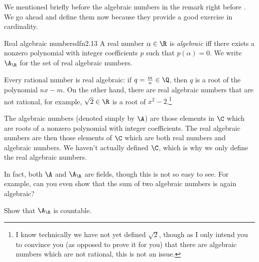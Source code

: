 We mentioned briefly before the algebraic numbers in the remark right before .  We go ahead and define them now because they provide a good exercise in cardinality.
\begin{dfn}{Real algebraic numbers}{dfn2.13}
A real number $\alpha \in \R$ is \emph{algebraic} iff there exists a nonzero polynomial with integer coefficients $p$ such that $p(\alpha )=0$.  We write $\A _{\R}$\index[notation]{$\A _{\R}$} for the set of real algebraic numbers.
\begin{rmk}
Every rational number is real algebraic:  if $q=\frac{m}{n}\in \Q$, then $q$ is a root of the polynomial $nx-m$.  On the other hand, there are real algebraic numbers that are not rational, for example, $\sqrt{2}\in \R$ is a root of $x^2-2$.\footnote{I know technically we have not yet defined $\sqrt{2}$, though as I only intend you to convince you (as opposed to prove it for you) that there are algebraic numbers which are not rational, this is not an issue.}
\end{rmk}
\begin{rmk}
The algebraic numbers (denoted simply by $\A$\index[notation]{$\A$}) are those elements in $\C$ which are roots of a nonzero polynomial with integer coefficients.  The real algebraic numbers are then those elements of $\C$ which are both real numbers and algebraic numbers.  We haven't actually defined $\C$, which is why we only define the real algebraic numbers.
\end{rmk}
\begin{rmk}
In fact, both $\A$ and $\A _{\R}$ are fields, though this is not so easy to see.  For example, can you even show that the sum of two algebraic numbers is again algebraic?
\end{rmk}
\end{dfn}
\begin{exr}{}{}
Show that $\A _{\R}$ is countable.
\end{exr}

